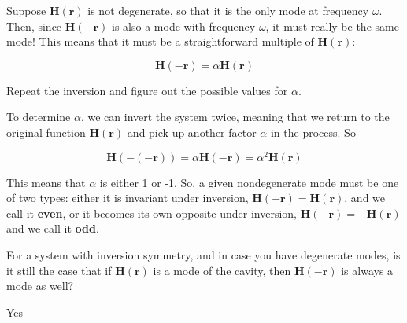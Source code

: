 Suppose ${\mathbf H({\mathbf r})}$ is not degenerate, so that it is the only mode at frequency $\omega$. Then, since ${\mathbf H(-{\mathbf{r}})}$ is also a mode with frequency $\omega$, it must really be the same mode! This means that it must be a straightforward multiple of ${\mathbf H({\mathbf r})}$:

\begin{equation}
{\mathbf H(-{\mathbf{r}})} = \alpha {\mathbf H({\mathbf r})}
\end{equation} 

\begin{cue}
Repeat the inversion and figure out the possible values for $\alpha$.    
\end{cue}

To determine $\alpha$, we can invert the system twice, meaning that we return to the original function ${\mathbf H({\mathbf r})}$ and pick up another factor $\alpha$ in the process. So

\begin{equation}
{\mathbf H(-(-{\mathbf{r}}))} = \alpha {\mathbf H(-{\mathbf r})} = \alpha^2 {\mathbf H({\mathbf r})}
\end{equation} 

\noindent{}This means that $\alpha$ is either 1 or -1. So, a given nondegenerate mode must be one of two types: either it is invariant under inversion, ${\mathbf H(-{\mathbf r})} = {\mathbf H({\mathbf r})}$, and we call it \textbf{even}, or it becomes its own opposite under inversion, ${\mathbf H(-{\mathbf r})} = - {\mathbf H({\mathbf r})}$ and we call it \textbf{odd}.

\vspace{1cm}

\begin{exer}
  For a system with inversion symmetry, and in case you have degenerate modes, is it still the case that if ${\mathbf H({\mathbf r})}$ is a mode of the cavity, then ${\mathbf H(-{\mathbf r})}$ is always a mode as well?  

\begin{sol}
Yes
\end{sol}
\end{exer}

\pagebreak


